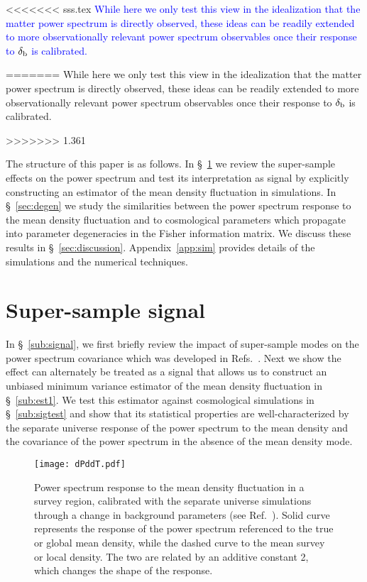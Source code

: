 \documentclass[prd,twocolumn,amsmath,amssymb,floatfix,superscriptaddress]{revtex4-1}
\newcommand{\wh}[1]{\textcolor{blue}{#1}}
\newcommand{\br}{{\rm b}}
\begin{document}
<<<<<<< sss.tex
\wh{While here we only test this view in the idealization that the matter power spectrum is
directly observed, these ideas can be readily extended to more observationally relevant
power spectrum observables once their response to $\delta_\br$ is calibrated.}

=======
While here we only test this view in the idealization that the matter power spectrum is
directly observed, these ideas can be readily extended to more observationally relevant
power spectrum observables once their response to $\delta_\br$ is calibrated.

>>>>>>> 1.361

The structure of this paper is as follows. In \S~\ref{sec:sss} we
 review the super-sample effects on the power spectrum and test its interpretation as signal
 by explicitly constructing an estimator of the mean density fluctuation in simulations.
In \S~\ref{sec:degen} we study the  similarities between the power spectrum response to the mean density fluctuation and to cosmological parameters which propagate into parameter
degeneracies in the Fisher information matrix.   We discuss these results in \S~\ref{sec:discussion}.   Appendix~\ref{app:sim} provides details of the simulations and the numerical techniques.


\section{Super-sample signal}
\label{sec:sss}

In  \S~\ref{sub:signal}, we first briefly review the impact of super-sample modes on the power spectrum covariance
 which was developed in 
{Refs.~\cite{Takada:2013wfa,Lietal:14}}.   Next we
 show the effect can alternately be treated as a signal that allows us to construct an unbiased
 minimum variance estimator of the mean density fluctuation 
in  \S~\ref{sub:est1}.
We test this estimator against cosmological simulations in \S~\ref{sub:sigtest}
and show that its statistical properties are well-characterized by the separate universe response of the
power spectrum to the mean density and the covariance of the power spectrum in the
absence of the mean density mode.


\begin{figure}[tb]
    \centering
    \texttt{[image: dPddT.pdf]}
    \caption{
Power spectrum response to the mean density fluctuation in a survey region,
calibrated with the separate universe simulations through
a change in background parameters (see Ref.~\cite{Lietal:14}).  
Solid curve represents the response of the power spectrum
referenced to the true or global mean density,
while the dashed curve to the mean survey or local density.  
The two are related by an additive constant 2,
which changes the shape of the response.
    }
    \label{fig:dPddT}
\end{figure}
\end{document}
